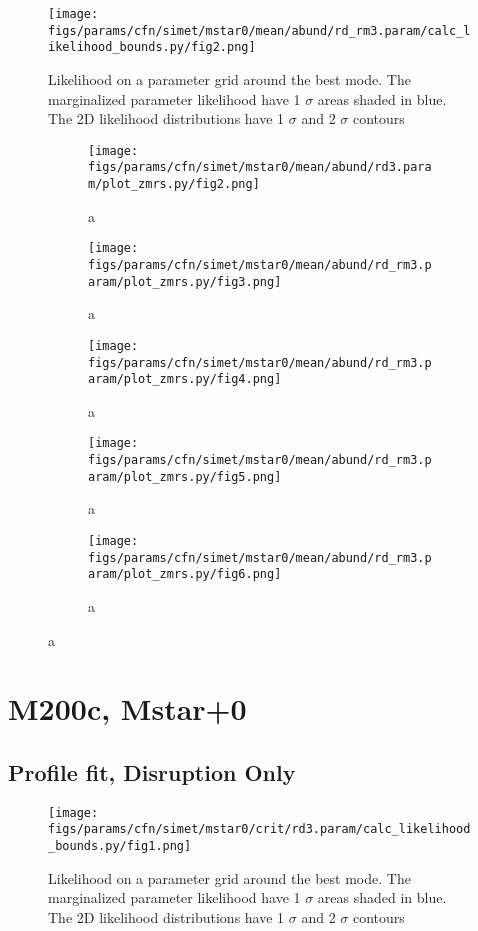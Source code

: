 \documentclass[twocolumn]{article}
\begin{document}
\begin{figure}[H]
  \center\texttt{[image: figs/params/cfn/simet/mstar0/mean/abund/rd\_rm3.param/calc\_likelihood\_bounds.py/fig2.png]}
  \caption{Likelihood on a parameter grid around the best mode. The marginalized parameter likelihood have
    1 $\sigma$ areas shaded in blue. The 2D likelihood distributions have 1 $\sigma$  and 2 $\sigma$ contours}
  \label{fig:basic_rd:likelihood}
\end{figure}

\begin{figure}
  \begin{subfigure}{.5\textwidth}
    \centering\texttt{[image: figs/params/cfn/simet/mstar0/mean/abund/rd3.param/plot\_zmrs.py/fig2.png]}
    \caption{a}
  \end{subfigure}
  \begin{subfigure}{.5\textwidth}
    \centering\texttt{[image: figs/params/cfn/simet/mstar0/mean/abund/rd\_rm3.param/plot\_zmrs.py/fig3.png]}
    \caption{a}
  \end{subfigure}
  \begin{subfigure}{.5\textwidth}
    \centering\texttt{[image: figs/params/cfn/simet/mstar0/mean/abund/rd\_rm3.param/plot\_zmrs.py/fig4.png]}
    \caption{a}
  \end{subfigure}%
  \begin{subfigure}{.5\textwidth}
    \centering\texttt{[image: figs/params/cfn/simet/mstar0/mean/abund/rd\_rm3.param/plot\_zmrs.py/fig5.png]}
    \caption{a}
  \end{subfigure}
  \begin{subfigure}{.5\textwidth}
    \centering\texttt{[image: figs/params/cfn/simet/mstar0/mean/abund/rd\_rm3.param/plot\_zmrs.py/fig6.png]}
    \caption{a}
  \end{subfigure}
\end{figure}
\clearpage



\section{M200c, Mstar+0}
\subsection{Profile fit, Disruption Only}
\begin{figure}[H]
  \center\texttt{[image: figs/params/cfn/simet/mstar0/crit/rd3.param/calc\_likelihood\_bounds.py/fig1.png]}
  \caption{Likelihood on a parameter grid around the best mode. The marginalized parameter likelihood have
    1 $\sigma$ areas shaded in blue. The 2D likelihood distributions have 1 $\sigma$  and 2 $\sigma$ contours}
  \label{fig:basic_rd:likelihood}
\end{figure}
\end{document}
